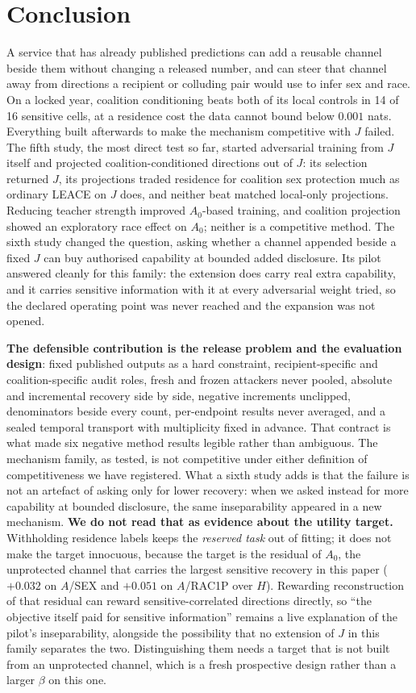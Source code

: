 \documentclass[10pt]{article}
\begin{document}
\section{Conclusion}

A service that has already published predictions can add a reusable channel beside them without changing a
released number, and can steer that channel away from directions a recipient or colluding pair would use to
infer sex and race. On a locked year, coalition conditioning beats both of its local controls in 14 of 16
sensitive cells, at a residence cost the data cannot bound below $0.001$ nats. Everything built afterwards to
make the mechanism competitive with $J$ failed. The fifth study, the most direct test so far, started
adversarial training from $J$ itself and projected coalition-conditioned directions out of $J$: its selection
returned $J$, its projections traded residence for coalition sex protection much as ordinary LEACE on $J$
does, and neither beat matched local-only projections. Reducing teacher strength improved $A_0$-based training,
and coalition projection showed an exploratory race effect on $A_0$; neither is a competitive method. The
sixth study changed the question, asking whether a channel appended beside a fixed $J$ can buy authorised
capability at bounded added disclosure. Its pilot answered cleanly for this family: the extension does carry
real extra capability, and it carries sensitive information with it at every adversarial weight tried, so the
declared operating point was never reached and the expansion was not opened.

\textbf{The defensible contribution is the release problem and the evaluation design}: fixed published outputs
as a hard constraint, recipient-specific and coalition-specific audit roles, fresh and frozen attackers never
pooled, absolute and incremental recovery side by side, negative increments unclipped, denominators beside
every count, per-endpoint results never averaged, and a sealed temporal transport with multiplicity fixed in
advance. That contract is what made six negative method results legible rather than ambiguous. The mechanism
family, as tested, is not competitive under either definition of competitiveness we have registered. What a
sixth study adds is that the failure is not an artefact of asking only for lower recovery: when we asked
instead for more capability at bounded disclosure, the same inseparability appeared in a new mechanism.
\textbf{We do not read that as evidence about the utility target.} Withholding residence labels keeps the
\emph{reserved task} out of fitting; it does not make the target innocuous, because the target is the residual
of $A_0$, the unprotected channel that carries the largest sensitive recovery in this paper ($+0.032$ on
$A$/SEX and $+0.051$ on $A$/RAC1P over $H$). Rewarding reconstruction of that residual can reward
sensitive-correlated directions directly, so ``the objective itself paid for sensitive information'' remains a
live explanation of the pilot's inseparability, alongside the possibility that no extension of $J$ in this
family separates the two. Distinguishing them needs a target that is not built from an unprotected channel,
which is a fresh prospective design rather than a larger $\beta$ on this one.
\end{document}
